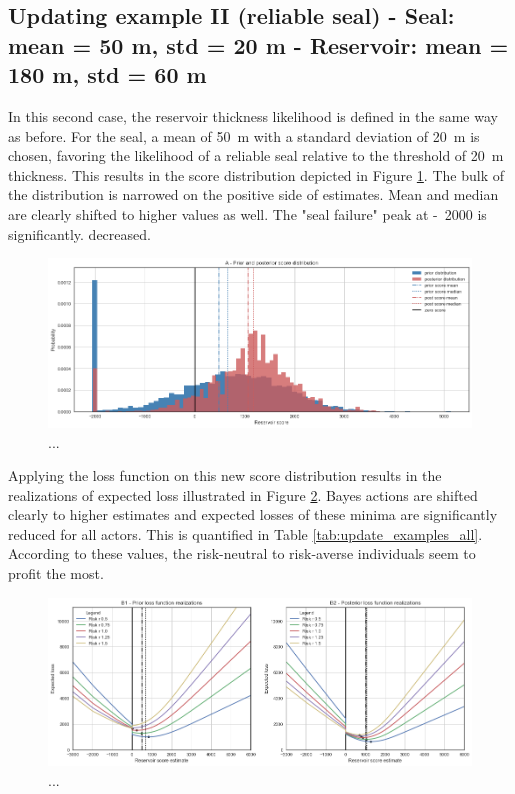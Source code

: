 	\subsection{Updating example II (reliable seal) - Seal: mean = 50 m, std = 20 m - Reservoir: mean = 180 m, std = 60 m}
	
	In this second case, the reservoir thickness likelihood is defined in the same way as before. For the seal, a mean of 50~m with a standard deviation of 20~m is chosen, favoring the likelihood of a reliable seal relative to the threshold of 20~m thickness. This results in the score distribution depicted in Figure \ref{fig:update_goodseal2}. The bulk of the distribution is narrowed on the positive side of estimates. Mean and median are clearly shifted to higher values as well. The "seal failure" peak at -~2000 is significantly. decreased.
	
	\begin{figure}[h]
		\centering
		\includegraphics[width=1\textwidth]{Figures/update_goodseal2.png}
		\caption{...}\label{fig:update_goodseal2} 
	\end{figure}
	
	Applying the loss function on this new score distribution results in the realizations of expected loss illustrated in Figure \ref{fig:update_goodseal3}. Bayes actions are shifted clearly to higher estimates and expected losses of these minima are significantly reduced for all actors. This is quantified in Table \ref{tab:update_examples_all}. According to these values, the risk-neutral to risk-averse individuals seem to profit the most.
	
	\begin{figure}[h]
		\centering
		\includegraphics[width=1\textwidth]{Figures/update_goodseal3.png}
		\caption{...}\label{fig:update_goodseal3} 
	\end{figure}
	
